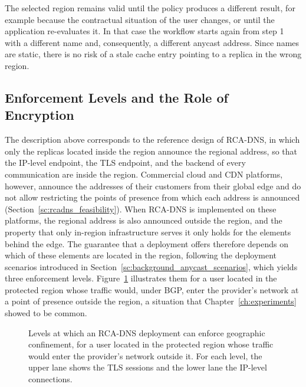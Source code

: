 The selected region remains valid until the policy produces a different result, for example because the contractual situation of the user changes, or until the application re-evaluates it. In that case the workflow starts again from step 1 with a different name and, consequently, a different anycast address. Since names are static, there is no risk of a stale cache entry pointing to a replica in the wrong region.

\subsection{Enforcement Levels and the Role of Encryption}
\label{sc:rcadns_enforcement}

The description above corresponds to the reference design of RCA-DNS, in which only the replicas located inside the region announce the regional address, so that the IP-level endpoint, the TLS endpoint, and the backend of every communication are inside the region. Commercial cloud and CDN platforms, however, announce the addresses of their customers from their global edge and do not allow restricting the points of presence from which each address is announced (Section~\ref{sc:rcadns_feasibility}). When RCA-DNS is implemented on these platforms, the regional address is also announced outside the region, and the property that only in-region infrastructure serves it only holds for the elements behind the edge. The guarantee that a deployment offers therefore depends on which of these elements are located in the region, following the deployment scenarios introduced in Section~\ref{sc:background_anycast_scenarios}, which yields three enforcement levels. Figure~\ref{fig:rcadns_enforcement_levels} illustrates them for a user located in the protected region whose traffic would, under BGP, enter the provider's network at a point of presence outside the region, a situation that Chapter~\ref{ch:experiments} showed to be common.

\begin{figure}[ht]
    \centering
    \resizebox{\textwidth}{!}{}
    \caption{Levels at which an RCA-DNS deployment can enforce geographic confinement, for a user located in the protected region whose traffic would enter the provider's network outside it. For each level, the upper lane shows the TLS sessions and the lower lane the IP-level connections.}
    \label{fig:rcadns_enforcement_levels}
\end{figure}

